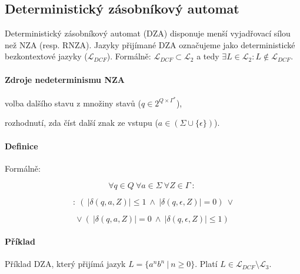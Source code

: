 \subsection{Deterministický zásobníkový automat}

Deterministický zásobníkový automat (DZA) disponuje menší vyjadřovací sílou než NZA (resp. RNZA). Jazyky přijímané DZA označujeme jako deterministické bezkontextové jazyky ($\mathcal{L}_{DCF}$). Formálně: $\mathcal{L}_{DCF} \subset \mathcal{L}_2$ a tedy $\exists L \in \mathcal{L}_2 : L \not\in \mathcal{L}_{DCF}$.

\paragraph*{Zdroje nedeterminismu NZA} \begin{compactitem}
    \item volba dalšího stavu z množiny stavů ($q \in 2^{Q \times \Gamma^*}$),
    \item rozhodnutí, zda číst další znak ze vstupu ($a \in ( \Sigma \cup \{ \epsilon \} )$).
\end{compactitem}

\paragraph*{Definice} Formálně:

$$ \forall q \in Q ~ \forall a \in \Sigma ~ \forall Z \in \Gamma ~:~ $$

$$ ~:~ ( ~ |\delta(q, a, Z)| \leq 1 ~\land~ | \delta(q, \epsilon, Z)| = 0 ) ~ \lor $$

$$ \lor ~ ( ~ |\delta(q, a, Z)| = 0 ~\land~ | \delta(q, \epsilon, Z)| \leq 1 ) $$

\paragraph*{Příklad} Příklad DZA, který přijímá jazyk $L = \{ a^n b^n ~|~ n \geq 0 \}$. Platí $L \in \mathcal{L}_{DCF} \setminus \mathcal{L}_3$.


